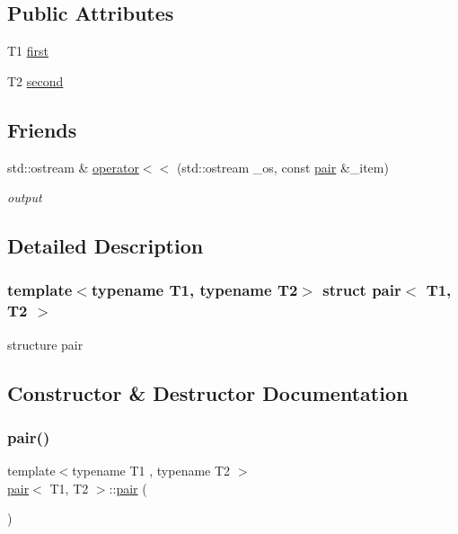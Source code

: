 \subsection*{Public Attributes}
\begin{DoxyCompactItemize}
\item 
T1 \hyperlink{structpair_aed925258783c91efbc5432030709d54e}{first}
\item 
T2 \hyperlink{structpair_a63ae1bbd5a6ce6bd6167b5359fa7a01f}{second}
\end{DoxyCompactItemize}
\subsection*{Friends}
\begin{DoxyCompactItemize}
\item 
std\+::ostream \& \hyperlink{structpair_a9cd7ed0b2b2d0a6d5977137d9cf35a0c}{operator$<$$<$} (std\+::ostream \+\_\+os, const \hyperlink{structpair}{pair} \&\+\_\+item)
\begin{DoxyCompactList}\small\item\em output \end{DoxyCompactList}\end{DoxyCompactItemize}


\subsection{Detailed Description}
\subsubsection*{template$<$typename T1, typename T2$>$\newline
struct pair$<$ T1, T2 $>$}

structure pair 

\subsection{Constructor \& Destructor Documentation}
\mbox{\label{structpair_a1dba17bb5c888d7ed8ce7b7c4acc52de}} 
\subsubsection{\texorpdfstring{pair()}{pair()}\hspace{0.1cm}{\footnotesize\ttfamily [1/3]}}
{\footnotesize\ttfamily template$<$typename T1 , typename T2 $>$ \\
\hyperlink{structpair}{pair}$<$ T1, T2 $>$\+::\hyperlink{structpair}{pair} (\begin{DoxyParamCaption}{ }\end{DoxyParamCaption})\hspace{0.3cm}{\ttfamily [inline]}}




